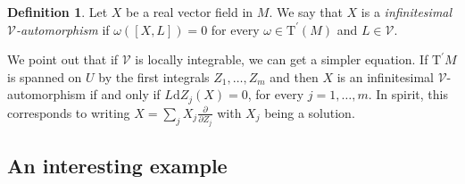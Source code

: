 \documentclass[11pt]{amsart}
\newcommand{\dop}[1]{\frac{\partial}{\partial #1}}
\theoremstyle{definition}
\newtheorem{defn}{Definition}[section]
\theoremstyle{remark}
\theoremstyle{plain}
\begin{document}
%
\begin{defn}\label{def:infaut}
Let $X$ be a real vector field in $M$. We say that $X$ is a \emph{infinitesimal $\mathcal{V}$-automorphism} if $\omega([X,L]) = 0$ for every $\omega \in \mathrm{T}^\prime(M)$ and $L \in \mathcal{V}$. 
\end{defn}
%
We point out that if $\mathcal{V}$ is locally integrable, we can get a simpler equation. If $\mathrm{T}^\prime M$ is spanned on $U$ by the first integrals $Z_1, \dots, Z_m$ and then $X$ is an infinitesimal $\mathcal{V}$-automorphism if and only if $L \mathrm{d}Z_j (X) = 0$, for every $j = 1, \dots, m$. In spirit, this
corresponds to writing $X = \sum_j X_j \dop{Z_j} $ with $X_j$ being a solution. 

\subsection{An interesting example}\label{sub:example}
\end{document}
